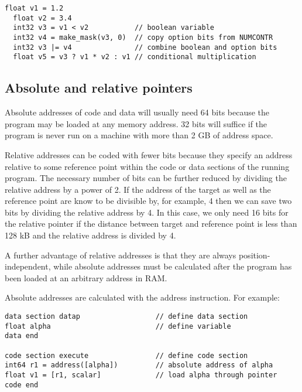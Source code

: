 \documentclass[forwardcom.tex]{subfiles}
\begin{document}
\begin{lstlisting}[frame=single]
  float v1 = 1.2
  float v2 = 3.4
  int32 v3 = v1 < v2           // boolean variable
  int32 v4 = make_mask(v3, 0)  // copy option bits from NUMCONTR
  int32 v3 |= v4               // combine boolean and option bits
  float v5 = v3 ? v1 * v2 : v1 // conditional multiplication
\end{lstlisting}
\vv


\subsection{Absolute and relative pointers} \label{AbsoluteAndRelativePointers}

Absolute addresses of code and data will usually need 64 bits because the program may be loaded at any memory address. 32 bits will suffice if the program is never run on a machine with more than 2 GB of address space.
\vv

Relative addresses can be coded with fewer bits because they specify an address relative to some reference point within the code or data sections of the running program. The necessary number of bits can be further reduced by dividing the relative address by a power of 2. If the address of the target as well as the reference point are know to be divisible by, for example, 4 then we can save two bits by dividing the relative address by 4. In this case, we only need 16 bits for the relative pointer if the distance between target and reference point is less than 128 kB and the relative address is divided by 4.
\vv

A further advantage of relative addresses is that they are always position-independent, while absolute addresses must be calculated after the program has been loaded at an arbitrary address in RAM.
\vv

Absolute addresses are calculated with the address instruction. For example:

\begin{example}
\label{addressInstruction2Pointer}
\end{example} %
\begin{lstlisting}[frame=single]
data section datap                  // define data section
float alpha                         // define variable
data end

code section execute                // define code section
int64 r1 = address([alpha])         // absolute address of alpha
float v1 = [r1, scalar]             // load alpha through pointer
code end
\end{lstlisting}
\vv
\end{document}
